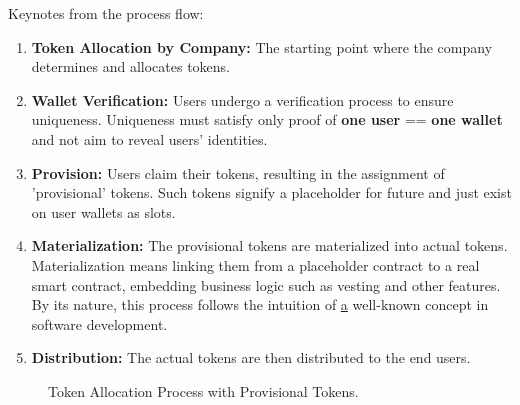 \documentclass[12pt,oneside]{article}
\begin{document}
Keynotes from the process flow:
\begin{enumerate}
  \item \textbf{Token Allocation by Company:} The starting point where the company determines and allocates tokens.
  \item \textbf{Wallet Verification:} Users undergo a verification process to ensure uniqueness. 
  Uniqueness must satisfy only proof of \textbf{one user} == \textbf{one wallet} and not aim to 
  reveal users’ identities.
  \item \textbf{Provision:} Users claim their tokens, resulting in the assignment of ’provisional’ tokens. Such tokens signify a placeholder for future
  and just exist on user wallets as slots.
  \item \textbf{Materialization:} The provisional tokens are materialized into actual tokens. Materialization 
  means linking them from a placeholder contract to a real smart contract, embedding business 
  logic such as vesting and other features. By its nature, this process follows the intuition 
  of \href{https://en.wikipedia.org/wiki/Late_binding} a well-known concept in software development. 
  \item \textbf{Distribution:} The actual tokens are then distributed to the end users.
\end{enumerate}

\begin{figure}[H]
  \centering
  \caption{Token Allocation Process with Provisional Tokens.}
  \label{fig:token_allocation_prov}
\end{figure}
\end{document}
